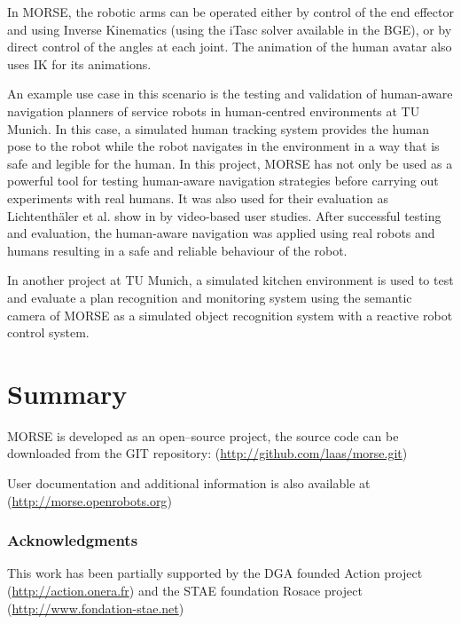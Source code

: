 \documentclass{llncs}
\begin{document}
In MORSE, the robotic arms can be operated either by control of the end
effector and using Inverse Kinematics (using the iTasc \cite{iTaSC} solver
available in the BGE), or by direct control of the angles at each joint.
The animation of the human avatar also uses IK for its animations.

An example use case in this scenario is the testing and validation of human-aware
navigation planners of service robots in human-centred environments at TU Munich. 
In this case, a simulated human tracking system provides the human pose to the robot
while the robot navigates in the environment in a way that is safe and legible
for the human. In this project, MORSE has not only be used as a powerful tool 
for testing human-aware navigation strategies before carrying out experiments
with real humans. It was also used for their evaluation as 
Lichtenth{\"a}ler et al. show in \cite{lichtenthaeler2012increasing} by 
video-based user studies. After successful testing and evaluation, the 
human-aware navigation was applied using real robots and humans resulting in 
a safe and reliable behaviour of the robot.

In another project at TU Munich, a simulated kitchen environment is used
to test and evaluate a plan recognition and monitoring system using the 
semantic camera of MORSE as a simulated object recognition system with 
a reactive robot control system.


\section{Summary}
\label{section:discussion}


MORSE is developed as an open--source project, the source code can be
downloaded from the GIT repository:
(\url{http://github.com/laas/morse.git})

User documentation and additional information is also available at
(\url{http://morse.openrobots.org})


\subsubsection*{Acknowledgments}
This work has been partially supported by the DGA founded Action project
(\url{http://action.onera.fr}) and the STAE foundation Rosace project
(\url{http://www.fondation-stae.net})



\end{document}
